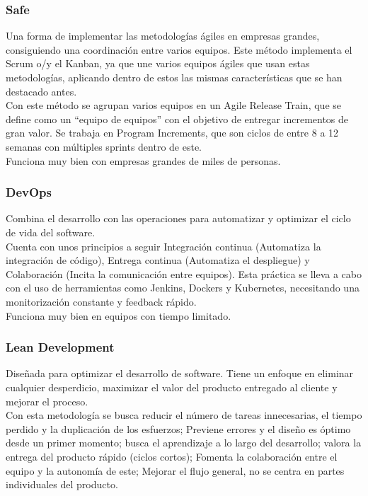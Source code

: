 \subsubsection{Safe}

Una forma de implementar las metodologías ágiles en empresas grandes, consiguiendo una coordinación entre varios equipos. Este método implementa el Scrum o/y el Kanban, ya que une varios equipos ágiles que usan estas metodologías, aplicando dentro de estos las mismas características que se han destacado antes.\\

Con este método se agrupan varios equipos en un Agile Release Train, que se define como un “equipo de equipos” con el objetivo de entregar incrementos de gran valor. Se trabaja en Program Increments, que son ciclos de entre 8 a 12 semanas con múltiples sprints dentro de este.\\

Funciona muy bien con empresas grandes de miles de personas.

\subsubsection{DevOps}

Combina el desarrollo con las operaciones para automatizar y optimizar el ciclo de vida del software.\\

Cuenta con unos principios a seguir Integración continua (Automatiza la integración de código), Entrega continua (Automatiza el despliegue) y Colaboración (Incita la comunicación entre equipos). Esta práctica se lleva a cabo con el uso de herramientas como Jenkins, Dockers y Kubernetes, necesitando una monitorización constante y feedback rápido.\\

Funciona muy bien en equipos con tiempo limitado.

\subsubsection{Lean Development}

Diseñada para optimizar el desarrollo de software. Tiene un enfoque en eliminar cualquier desperdicio, maximizar el valor del producto entregado al cliente y mejorar el proceso.\\

Con esta metodología se busca reducir el número de tareas innecesarias, el tiempo perdido y la duplicación de los esfuerzos; Previene errores y el diseño es óptimo desde un primer momento; busca el aprendizaje a lo largo del desarrollo; valora la entrega del producto rápido (ciclos cortos); Fomenta la colaboración entre el equipo y la autonomía de este; Mejorar el flujo general, no se centra en partes individuales del producto.\\

